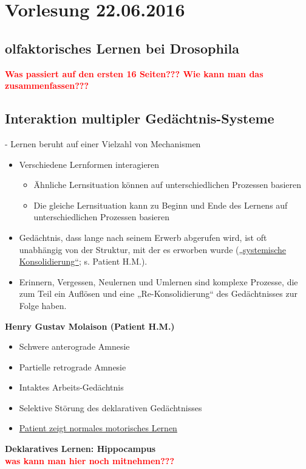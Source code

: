 \section{Vorlesung 22.06.2016}

\subsection{olfaktorisches Lernen bei Drosophila}

\textcolor{red}{\textbf{Was passiert auf den ersten 16 Seiten??? Wie kann man das zusammenfassen???}}

\subsection{Interaktion multipler Gedächtnis-Systeme}
 - Lernen beruht auf einer Vielzahl von Mechanismen
\begin{itemize}
	\item Verschiedene Lernformen interagieren
	\begin{itemize}
		\item Ähnliche Lernsituation können auf unterschiedlichen
Prozessen basieren
		\item Die gleiche Lernsituation kann zu Beginn und Ende des Lernens auf unterschiedlichen Prozessen basieren
	\end{itemize}
	\item Gedächtnis, dass lange nach seinem Erwerb abgerufen wird, ist oft unabhängig von der Struktur, mit der es erworben wurde (\underline{„systemische Konsolidierung“}; s. Patient H.M.).
	\item Erinnern, Vergessen, Neulernen und Umlernen sind komplexe Prozesse, die zum Teil ein Auflösen und eine „Re-Konsolidierung“ des Gedächtnisses zur Folge haben.
\end{itemize}

\textbf{Henry Gustav Molaison (Patient H.M.)}
\begin{itemize}
	\item Schwere anterograde Amnesie
	\item Partielle retrograde Amnesie
	\item Intaktes Arbeits-Gedächtnis
	\item Selektive Störung des deklarativen Gedächtnisses
	\item \underline{Patient zeigt normales motorisches Lernen}
\end{itemize}

\textbf{Deklaratives Lernen: Hippocampus}\\
\textcolor{red}{\textbf{was kann man hier noch mitnehmen???}}
\newpage
